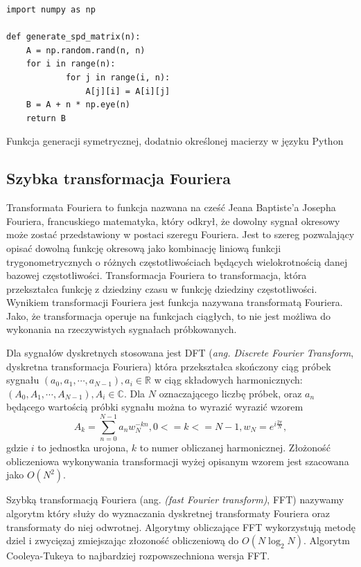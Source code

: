 \documentclass[a4paper,12pt]{book} %
\begin{document}
\begin{lstfloat}[H]
\lstset{language=Python}
\begin{lstlisting}[frame=single]
import numpy as np

def generate_spd_matrix(n):
	A = np.random.rand(n, n)
	for i in range(n):
    		for j in range(i, n):
        		A[j][i] = A[i][j]
	B = A + n * np.eye(n)
	return B
\end{lstlisting}
\caption{Funkcja generacji symetrycznej, dodatnio określonej macierzy w języku Python}
\label{lst:gen_spd_matrix}
\end{lstfloat}

\subsection{Szybka transformacja Fouriera}
Transformata Fouriera to funkcja nazwana na cześć Jeana Baptiste'a Josepha Fouriera, francuskiego matematyka, który odkrył, że dowolny sygnał okresowy może zostać przedstawiony w postaci szeregu Fouriera. Jest to szereg pozwalający opisać dowolną funkcję okresową jako kombinację liniową funkcji trygonometrycznych o różnych częstotliwościach będących wielokrotnością danej bazowej częstotliwości. Transformacja Fouriera to transformacja, która przekształca funkcję z dziedziny czasu w funkcję dziedziny częstotliwości. Wynikiem transformacji Fouriera jest funkcja nazywana transformatą Fouriera. Jako, że transformacja operuje na funkcjach ciągłych, to nie jest możliwa do wykonania na rzeczywistych sygnałach próbkowanych. 

Dla sygnałów dyskretnych stosowana jest DFT (\emph{ang. Discrete Fourier Transform}, dyskretna transformacja Fouriera) która przekształca skończony ciąg próbek sygnału $(a_0,a_1,\cdots,a_{N-1}), a_i \in \mathbb{R}$ w ciąg składowych harmonicznych: $(A_0,A_1,\cdots,A_{N-1}),A_i \in \mathbb{C}.$
Dla $N$ oznaczającego liczbę próbek, oraz $a_n$ będącego wartością próbki sygnału można to wyrazić wyrazić wzorem
$$A_k=\sum_{n=0}^{N-1}a_nw_N^{-kn}, 0 <= k <= N-1,
w_N = e^{i\frac{2\pi}{N}},$$
gdzie $i$ to jednostka urojona, $k$ to numer obliczanej harmonicznej. Złożoność obliczeniowa wykonywania transformacji wyżej opisanym wzorem jest szacowana jako $O(N^2)$.

Szybką transformacją Fouriera (ang. \emph{(fast Fourier transform)}, FFT) nazywamy algorytm który służy do wyznaczania dyskretnej transformaty Fouriera oraz transformaty do niej odwrotnej. Algorytmy obliczające FFT wykorzystują metodę dziel i zwycięzaj zmiejszając złozoność obliczeniową do $O(N\log_2N)$. Algorytm Cooleya-Tukeya to najbardziej rozpowszechniona wersja FFT.
\end{document}
